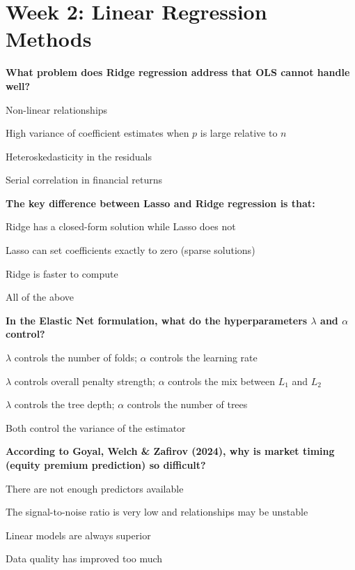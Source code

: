 \documentclass[11pt]{article}
\begin{document}
\section*{Week 2: Linear Regression Methods}

\begin{questions}[resume]

\item \textbf{What problem does Ridge regression address that OLS cannot handle well?}
\begin{options}
  \item Non-linear relationships
  \item High variance of coefficient estimates when $p$ is large relative to $n$
  \item Heteroskedasticity in the residuals
  \item Serial correlation in financial returns
\end{options}

\item \textbf{The key difference between Lasso and Ridge regression is that:}
\begin{options}
  \item Ridge has a closed-form solution while Lasso does not
  \item Lasso can set coefficients exactly to zero (sparse solutions)
  \item Ridge is faster to compute
  \item All of the above
\end{options}

\item \textbf{In the Elastic Net formulation, what do the hyperparameters $\lambda$ and $\alpha$ control?}
\begin{options}
  \item $\lambda$ controls the number of folds; $\alpha$ controls the learning rate
  \item $\lambda$ controls overall penalty strength; $\alpha$ controls the mix between $L_1$ and $L_2$
  \item $\lambda$ controls the tree depth; $\alpha$ controls the number of trees
  \item Both control the variance of the estimator
\end{options}

\item \textbf{According to Goyal, Welch \& Zafirov (2024), why is market timing (equity premium prediction) so difficult?}
\begin{options}
  \item There are not enough predictors available
  \item The signal-to-noise ratio is very low and relationships may be unstable
  \item Linear models are always superior
  \item Data quality has improved too much
\end{options}


\end{questions}
\end{document}
